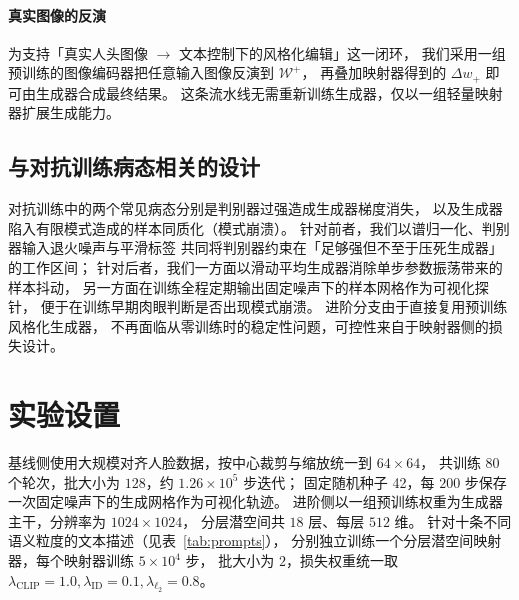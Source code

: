 \documentclass[11pt,a4paper]{ctexart}
\begin{document}
\paragraph{真实图像的反演}
为支持「真实人头图像 $\rightarrow$ 文本控制下的风格化编辑」这一闭环，
我们采用一组预训练的图像编码器把任意输入图像反演到 $\mathcal W^+$，
再叠加映射器得到的 $\Delta w_+$ 即可由生成器合成最终结果。
这条流水线无需重新训练生成器，仅以一组轻量映射器扩展生成能力。

\subsection{与对抗训练病态相关的设计}
对抗训练中的两个常见病态分别是判别器过强造成生成器梯度消失，
以及生成器陷入有限模式造成的样本同质化（模式崩溃）。
针对前者，我们以谱归一化、判别器输入退火噪声与平滑标签
共同将判别器约束在「足够强但不至于压死生成器」的工作区间；
针对后者，我们一方面以滑动平均生成器消除单步参数振荡带来的样本抖动，
另一方面在训练全程定期输出固定噪声下的样本网格作为可视化探针，
便于在训练早期肉眼判断是否出现模式崩溃。
进阶分支由于直接复用预训练风格化生成器，
不再面临从零训练时的稳定性问题，可控性来自于映射器侧的损失设计。

\section{实验设置}
基线侧使用大规模对齐人脸数据，按中心裁剪与缩放统一到 $64\times 64$，
共训练 80 个轮次，批大小为 $128$，约 $1.26\times 10^5$ 步迭代；
固定随机种子 42，每 $200$ 步保存一次固定噪声下的生成网格作为可视化轨迹。
进阶侧以一组预训练权重为生成器主干，分辨率为 $1024\times 1024$，
分层潜空间共 $18$ 层、每层 $512$ 维。
针对十条不同语义粒度的文本描述（见表~\ref{tab:prompts}），
分别独立训练一个分层潜空间映射器，每个映射器训练 $5\times 10^4$ 步，
批大小为 $2$，损失权重统一取
$\lambda_\mathrm{CLIP}=1.0,\lambda_\mathrm{ID}=0.1,\lambda_{\ell_2}=0.8$。
\end{document}
